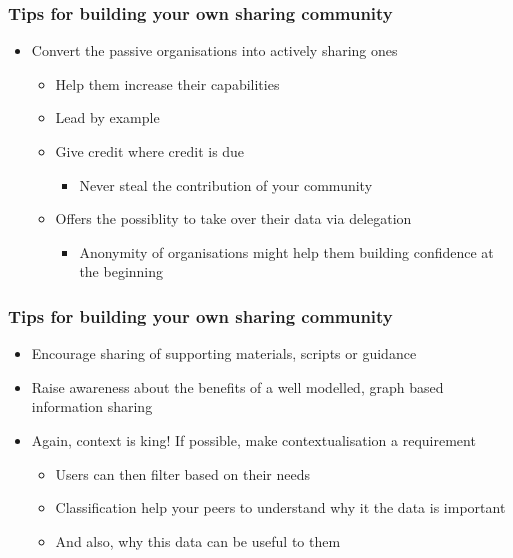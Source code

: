 \begin{frame}
    \frametitle{Tips for building your own sharing community}
    \begin{itemize}
        \item Convert the passive organisations into actively sharing ones
        \begin{itemize}
            \item Help them increase their capabilities
            \item Lead by example
            \item Give credit where credit is due
            \begin{itemize}
                \item Never steal the contribution of your community
            \end{itemize}
            \item Offers the possiblity to take over their data via delegation
            \begin{itemize}
                \item Anonymity of organisations might help them building confidence at the beginning
            \end{itemize}
        \end{itemize}
    \end{itemize}
\end{frame}

\begin{frame}
    \frametitle{Tips for building your own sharing community}
    \begin{itemize}
        \item Encourage sharing of supporting materials, scripts or guidance
        \item Raise awareness about the benefits of a well modelled, graph based information sharing
        \item Again, context is king! If possible, make contextualisation a requirement
        \begin{itemize}
            \item Users can then filter based on their needs
            \item Classification help your peers to understand why it the data is important
            \item And also, why this data can be useful to them
        \end{itemize}
    \end{itemize}
\end{frame}

